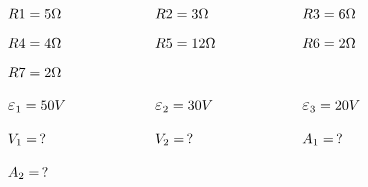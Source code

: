 \documentclass[12pt]{report}
\newcommand {\LEpsilon}{\mathlarger\varepsilon}
\begin{document}
$$
\begin{aligned}
    &R1=5\Omega \hspace{2cm} &&R2=3\Omega \hspace{2cm} && R3=6\Omega\\[6pt]
    &R4=4\Omega  &&R5=12\Omega  &&R6=2\Omega\\[6pt]
    &R7=2\Omega\\[6pt]
    &\LEpsilon_1=50V &&\LEpsilon_2=30V&&\LEpsilon_3=20V\\[6pt]
    &V_1=\,? &&V_2=\,? &&A_1=\,?\\[6pt]
    &A_2=\,?\\[6pt]
\end{aligned}
$$
\end{document}
